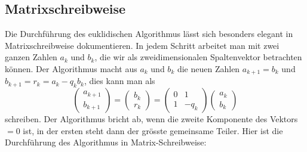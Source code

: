 \subsection{Matrixschreibweise}
Die Durchführung des euklidischen Algorithmus lässt sich besonders elegant
in Matrixschreibweise dokumentieren.
In jedem Schritt arbeitet man mit zwei ganzen Zahlen $a_k$ und $b_k$, die wir
als zweidimensionalen Spaltenvektor betrachten können.
Der Algorithmus macht aus $a_k$ und $b_k$ die neuen Zahlen
$a_{k+1} = b_k$ und $b_{k+1} = r_k = a_k - q_kb_k$, dies
kann man als
\[
\begin{pmatrix} a_{k+1} \\ b_{k+1} \end{pmatrix}
=
\begin{pmatrix} b_k \\ r_k \end{pmatrix}
=
\begin{pmatrix} 0 & 1 \\ 1 & -q_k \end{pmatrix}
\begin{pmatrix} a_{k} \\ b_{k} \end{pmatrix}
\]
schreiben.
Der Algorithmus bricht ab, wenn die zweite Komponente des Vektors $=0$ ist,
in der ersten steht dann der grösste gemeinsame Teiler.
Hier ist die Durchführung des Algorithmus in Matrix-Schreibweise:
